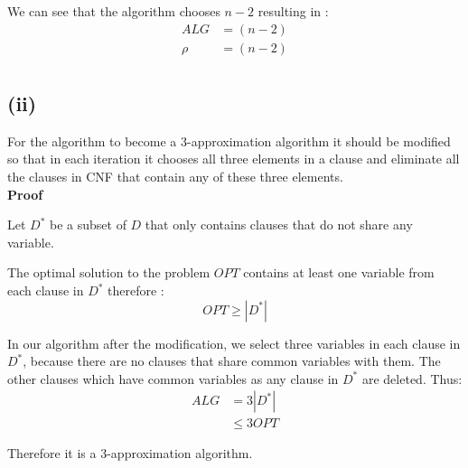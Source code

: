 We can see that the algorithm chooses $ n-2 $ resulting in :
\begin{align*}
	ALG &= (n-2)\\
	\rho &= (n-2) \\
\end{align*}

\subsection*{(ii)}
For the algorithm to become a 3-approximation algorithm it should be modified so that in each iteration it chooses all three elements in a clause and eliminate all the clauses in CNF that contain any of these three elements.\\

\textbf{Proof}

Let $ D^* $ be a subset of $ D $ that only contains clauses that do not share any variable.

The optimal solution to the problem $ OPT $ contains at least one variable from each clause in $D^*$ therefore :
$$ OPT \ge |D^*|$$ 

In our algorithm after the modification, we select three variables in each clause in $ D^* $,
because there are no clauses that share common variables with them.
The other clauses which have common variables as any clause in $ D^* $ are deleted.
Thus:
\begin{align*}
	ALG &= 3 |D^*| \\
	&\leq 3 OPT
\end{align*}

Therefore it is a 3-approximation algorithm.
